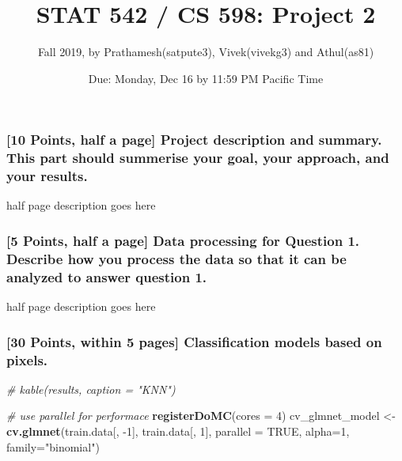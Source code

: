 \documentclass[]{article}
\title{STAT 542 / CS 598: Project 2}
\author{Fall 2019, by Prathamesh(satpute3), Vivek(vivekg3) and Athul(as81)}
\date{Due: Monday, Dec 16 by 11:59 PM Pacific Time}
\newenvironment{Shaded}{\begin{snugshade}}{\end{snugshade}}
\newcommand{\CommentTok}[1]{\textcolor[rgb]{0.56,0.35,0.01}{\textit{#1}}}
\newcommand{\DataTypeTok}[1]{\textcolor[rgb]{0.13,0.29,0.53}{#1}}
\newcommand{\DecValTok}[1]{\textcolor[rgb]{0.00,0.00,0.81}{#1}}
\newcommand{\KeywordTok}[1]{\textcolor[rgb]{0.13,0.29,0.53}{\textbf{#1}}}
\newcommand{\NormalTok}[1]{#1}
\newcommand{\OtherTok}[1]{\textcolor[rgb]{0.56,0.35,0.01}{#1}}
\newcommand{\StringTok}[1]{\textcolor[rgb]{0.31,0.60,0.02}{#1}}
\begin{document}
\maketitle

\hypertarget{points-half-a-page-project-description-and-summary.-this-part-should-summerise-your-goal-your-approach-and-your-results.}{%
\subsubsection{{[}10 Points, half a page{]} Project description and
summary. This part should summerise your goal, your approach, and your
results.}\label{points-half-a-page-project-description-and-summary.-this-part-should-summerise-your-goal-your-approach-and-your-results.}}

half page description goes here

\hypertarget{points-half-a-page-data-processing-for-question-1.-describe-how-you-process-the-data-so-that-it-can-be-analyzed-to-answer-question-1.}{%
\subsubsection{{[}5 Points, half a page{]} Data processing for Question
1. Describe how you process the data so that it can be analyzed to
answer question
1.}\label{points-half-a-page-data-processing-for-question-1.-describe-how-you-process-the-data-so-that-it-can-be-analyzed-to-answer-question-1.}}

half page description goes here

\hypertarget{points-within-5-pages-classification-models-based-on-pixels.}{%
\subsubsection{{[}30 Points, within 5 pages{]} Classification models
based on
pixels.}\label{points-within-5-pages-classification-models-based-on-pixels.}}

\begin{Shaded}
\begin{Highlighting}[]
  \CommentTok{# kable(results, caption = "KNN")}
\end{Highlighting}
\end{Shaded}

\begin{Shaded}
\begin{Highlighting}[]
\CommentTok{# use parallel for performace }
  \KeywordTok{registerDoMC}\NormalTok{(}\DataTypeTok{cores =} \DecValTok{4}\NormalTok{)}
\NormalTok{  cv_glmnet_model <-}\StringTok{ }\KeywordTok{cv.glmnet}\NormalTok{(train.data[, }\DecValTok{-1}\NormalTok{], train.data[, }\DecValTok{1}\NormalTok{], }\DataTypeTok{parallel =} \OtherTok{TRUE}\NormalTok{, }\DataTypeTok{alpha=}\DecValTok{1}\NormalTok{, }\DataTypeTok{family=}\StringTok{"binomial"}\NormalTok{)}
\end{Highlighting}
\end{Shaded}
\end{document}
